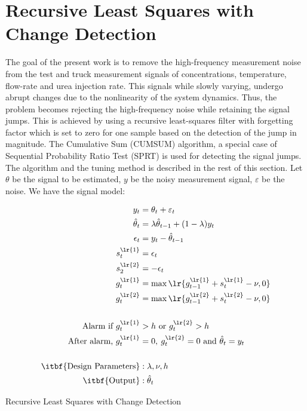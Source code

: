\section{Recursive Least Squares with Change Detection \cite{gustafsson2000adaptive}}
The goal of the present work is to remove the high-frequency measurement noise from the test and truck measurement signals of concentrations, temperature, flow-rate and urea injection rate. This signals while slowly varying, undergo abrupt changes due to the nonlinearity of the system dynamics. Thus, the problem becomes rejecting the high-frequency noise while retaining the signal jumps. This is achieved by using a recursive least-squares filter with forgetting factor which is set to zero for one sample based on the detection of the jump in magnitude. The Cumulative Sum (CUMSUM) algorithm, a special case of Sequential Probability Ratio Test (SPRT) is used for detecting the signal jumps. The algorithm and the tuning method is described in the rest of this section. Let $\theta$ be the signal to be estimated, $y$ be the noisy measurement signal, $\varepsilon$ be the noise. We have the signal model:
\begin{algorithm}
\begin{align*}
        y_t &= \theta_t + \varepsilon_t\\
        \hat \theta_t &= \lambda \hat \theta_{t-1} + (1-\lambda) y_t \\
        \epsilon_t &= y_t - \hat \theta_{t-1} \\
        s^{\lr{1}}_t &= \epsilon_t \\
        s^{\lr{2}}_2 &= -\epsilon_t \\
        g_t^{\lr{1}} &= \max \lr{g_{t-1}^{\lr{1}} + s_t^{\lr{1}} - \nu, 0}\\
        g_t^{\lr{2}} &= \max \lr{g_{t-1}^{\lr{2}} + s_t^{\lr{2}} - \nu, 0}\\
        &\\
        \text{Alarm if } g_t^{\lr{1}} &> h \text{ or } g_t^{\lr{2}} > h \\
        \text{After alarm, } g_t^{\lr{1}} &= 0, \: g_t^{\lr{2}} = 0 \text{ and } \hat \theta_t = y_t\\
        &\\
        \text{\itbf{Design Parameters}} &: \lambda, \nu, h\\
        \text{\itbf{Output}} &: \hat \theta_t
\end{align*}
\caption{Recursive Least Squares with Change Detection}
\end{algorithm}

